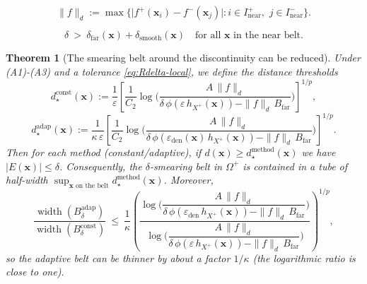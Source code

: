 \documentclass[10pt,a4paper]{amsart}
\newtheorem{theorem}{Theorem}
\begin{document}
\begin{equation}\label{salto}
\|f\|_{d}
:= \max\{\bigl| f^+(\mathbf{x}_i) - f^-(\mathbf{x}_j) \bigr|: i\in I^+_{\mathrm{near}},\,\,j \in I^-_{\mathrm{near}}\}.
\end{equation}

\begin{equation}\label{eq:Rdelta-local}
\delta\ >\ \delta_{\mathrm{far}}(\mathbf{x})+\delta_{\mathrm{smooth}}(\mathbf{x})
\quad\text{for all $\mathbf{x}$ in the near belt}.
\end{equation}

\begin{theorem}[The smearing belt around the discontinuity can be reduced]
\label{thm:thinning-local}
Under \textnormal{(A1)}-\textnormal{(A3)} and a tolerance \eqref{eq:Rdelta-local}, we define the
distance thresholds
\[
d_{\star}^{\mathrm{const}}(\mathbf{x})
:=\frac{1}{\varepsilon}\left[
\frac{1}{C_2}\log\!\Big(
\frac{A\,\|f\|_{d}}{
\delta\,\phi(\varepsilon\,h_{X^{+}}(\mathbf{x}))-\|f\|_{d}\,B_{\mathrm{far}}}
\Big)\right]^{\!1/p},
\]
\[
d_{\star}^{\mathrm{adap}}(\mathbf{x})
:=\frac{1}{\kappa\,\varepsilon}\left[
\frac{1}{C_2}\log\!\Big(
\frac{A\,\|f\|_{d}}{
\delta\,\phi(\varepsilon_{\mathrm{den}}(\mathbf{x})\,h_{X^{+}}(\mathbf{x}))
-\|f\|_{d}\,B_{\mathrm{far}}}
\Big)\right]^{\!1/p}.
\]
Then for each method (constant/adaptive), \emph{if} $d(\mathbf{x})\ge d_{\star}^{\mathrm{method}}(\mathbf{x})$
we have $|E(\mathbf{x})|\le \delta$. Consequently, the $\delta$-smearing belt in $\Omega^{+}$ is contained in
a tube of half-width $\sup_{\mathbf{x}\text{ on the belt}} d_{\star}^{\mathrm{method}}(\mathbf{x})$.
Moreover,
\[
\frac{\operatorname{width}(B_{\delta}^{\mathrm{adap}})}
     {\operatorname{width}(B_{\delta}^{\mathrm{const}})}
\ \le\
\frac{1}{\kappa}\left(
\frac{
\log\Big(\!\dfrac{A\,\|f\|_{d}}{\delta\,\phi(\varepsilon_{\mathrm{den}}\,h_{X^{+}}(\mathbf{x}))-\|f\|_{d}\,B_{\mathrm{far}}}\Big)
}{
\log\Big(\!\dfrac{A\,\|f\|_{d}}{\delta\,\phi(\varepsilon\,h_{X^{+}}(\mathbf{x}))-\|f\|_{d}\,B_{\mathrm{far}}}\Big)
}
\right)^{\!1/p},
\]
so the adaptive belt can be thinner by about a factor $1/\kappa$ (the logarithmic ratio is close to one).
\end{theorem}
\end{document}
